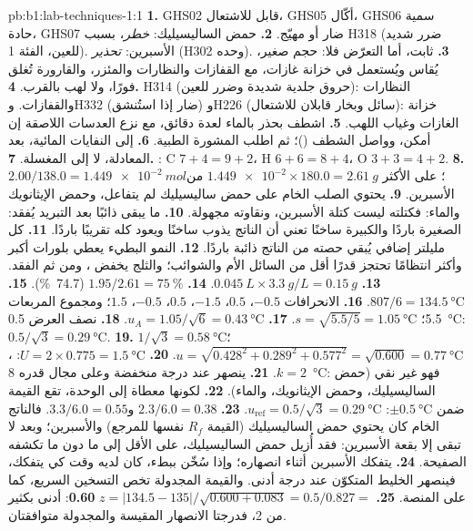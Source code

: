 \begin{solution}{pb:b1:lab-techniques-1:1}
\textbf{1.} GHS02 قابل للاشتعال، GHS05 أكّال، GHS06 سمية حادة، GHS07
ضار أو مهيّج.
\textbf{2.} حمض الساليسيليك: \emph{خطر}، بسبب H318 (ضرر شديد
للعين، الفئة 1). الأسبرين: \emph{تحذير} (H302 وحده).
\textbf{3.}  ثابت، أما التعرّض فلا: حجم صغير،
يُقاس ويُستعمل في خزانة غازات، مع القفازات والنظارات والمئزر،
والقارورة تُغلق فورًا، ولا لهب بالقرب.
\textbf{4.} H314 (حروق جلدية شديدة وضرر للعين): النظارات والقفازات.
وH332 (ضار إذا استُنشق) وH226 (سائل وبخار قابلان للاشتعال): خزانة
الغازات وغياب اللهب.
\textbf{5.} اشطف بحذر بالماء لعدة دقائق، مع نزع
العدسات اللاصقة إن أمكن، وواصل الشطف ()؛ ثم اطلب
المشورة الطبية.
\textbf{6.} إلى النفايات المائية، بعد المعادلة، لا إلى
المغسلة.
\textbf{7.} : C $7 + 4 = 9 + 2$،
H $6 + 6 = 8 + 4$، O $3 + 3 = 4 + 2$.
\textbf{8.} $2.00/138.0 = \qty{1.449e-2}{mol}$؛ على الأكثر
$\num{1.449e-2} \times 180.0 = \qty{2.61}{g}$ من الأسبرين.
\textbf{9.} يحتوي الصلب الخام على حمض ساليسيليك لم يتفاعل، وحمض
الإيثانويك والماء: فكتلته ليست كتلة الأسبرين، ونقاوته
مجهولة.
\textbf{10.} ما يبقى ذائبًا بعد التبريد يُفقد:  الصغيرة
باردًا والكبيرة ساخنًا تعني أن الناتج يذوب ساخنًا ويعود
كله تقريبًا باردًا.
\textbf{11.} كل مليلتر إضافي يُبقي حصته من الناتج ذائبة
باردًا.
\textbf{12.} النمو البطيء يعطي بلورات أكبر وأكثر انتظامًا تحتجز
قدرًا أقل من السائل الأم والشوائب؛ والثلج يخفض ، ومن ثم
الفقد.
\textbf{13.} $\qty{0.045}{L} \times \qty{3.3}{g/L} = \qty{0.15}{g}$.
\textbf{14.} $1.95/2.61 = \qty{75}{\percent}$ (\qty{74.7}{\percent}).
\textbf{15.} $807/6 = \qty{134.5}{\celsius}$.
\textbf{16.} الانحرافات $-0.5$، $0.5$، $-1.5$، $0.5$، $-0.5$، $1.5$؛ ومجموع
المربعات 5.5؛ $s = \sqrt{5.5/5} = \qty{1.05}{\celsius}$.
\textbf{17.} $u_A = 1.05/\sqrt6 = \qty{0.43}{\celsius}$.
\textbf{18.} نصف العرض \qty{0.5}{\celsius}: $0.5/\sqrt3 = \qty{0.29}{\celsius}$.
\textbf{19.} $1/\sqrt3 = \qty{0.58}{\celsius}$؛
$u = \sqrt{0.428^2 + 0.289^2 + 0.577^2} = \sqrt{0.600} = \qty{0.77}{\celsius}$.
\textbf{20.} $U = 2 \times 0.775 = \qty{1.5}{\celsius}$:
، $k = 2$.
\textbf{21.} ينصهر عند درجة منخفضة وعلى مجال قدره \qty{8}{\celsius}: فهو
غير نقي (حمض الساليسيليك، وحمض الإيثانويك، والماء).
\textbf{22.} لكونها معطاة إلى الوحدة، تقع القيمة ضمن $\pm\qty{0.5}{\celsius}$:
$u_{\mathrm{ref}} = 0.5/\sqrt3 = \qty{0.29}{\celsius}$.
\textbf{23.} $2.3/6.0 = 0.38$ و$3.3/6.0 = 0.55$. فالناتج الخام
كان يحتوي حمض الساليسيليك (القيمة $R_f$ نفسها للمرجع) والأسبرين؛ وبعد
 لا تبقى إلا بقعة الأسبرين: فقد أُزيل حمض الساليسيليك،
على الأقل إلى ما دون ما تكشفه الصفيحة.
\textbf{24.} يتفكك الأسبرين أثناء انصهاره؛ وإذا سُخّن ببطء، كان لديه وقت كي
يتفكك، فينصهر الخليط المتكوّن عند درجة أدنى. والقيمة المجدولة تخص
التسخين السريع، كما على المنصة.
\textbf{25.} $z = |134.5 - 135|/\sqrt{0.600 + 0.083} = 0.5/0.827 =$
\textbf{0.60}: أدنى بكثير من 2، فدرجتا الانصهار المقيسة والمجدولة
متوافقتان.
\end{solution}
